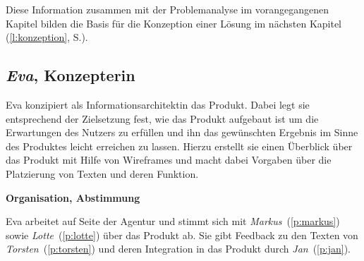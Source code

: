 \bigskip

Diese Information zusammen mit der Problemanalyse im vorangegangenen Kapitel bilden die Basis für die Konzeption einer Lösung im nächsten Kapitel (\ref{l:konzeption}, S.\pageref{l:konzeption}).

\pagebreak

\subsection{\emph{Eva}, Konzepterin}\label{p:eva}

\begin{multicols}{2}

\begin{center}
\end{center}


Eva konzipiert als Informationsarchitektin das Produkt. Dabei legt sie entsprechend der Zielsetzung fest, wie das Produkt aufgebaut ist um die Erwartungen des Nutzers zu erfüllen und ihn das gewünschten Ergebnis im Sinne des Produktes leicht erreichen zu lassen. Hierzu erstellt sie einen Überblick über das Produkt mit Hilfe von Wireframes und macht dabei Vorgaben über die Platzierung von Texten und deren Funktion.

\textbf{Organisation, Abstimmung}

Eva arbeitet auf Seite der Agentur und stimmt sich mit \emph{Markus}~(\ref{p:markus}) sowie \emph{Lotte}~(\ref{p:lotte}) über das Produkt ab. Sie gibt Feedback zu den Texten von \emph{Torsten}~(\ref{p:torsten}) und deren Integration in das Produkt durch \emph{Jan}~(\ref{p:jan}).


\end{multicols}
